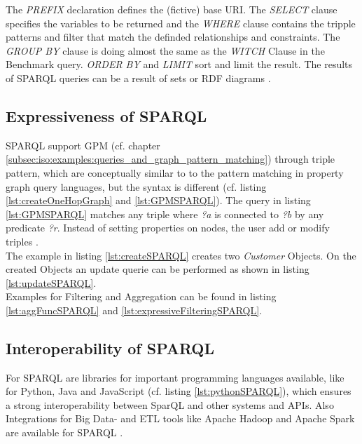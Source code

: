 The \textit{PREFIX} declaration defines the (fictive) base URI.
The \textit{SELECT} clause specifies the variables to be returned and the
\textit{WHERE} clause contains the tripple patterns and filter that match 
the definded relationships and constraints.
The \textit{GROUP BY} clause is doing almost the same as the \textit{WITCH} Clause in 
the Benchmark query.
\textit{ORDER BY} and \textit{LIMIT} sort and limit the result.
 The results of SPARQL queries can be a result 
of sets or RDF diagrams \citep{sparql_2024}.

\subsection{Expressiveness of SPARQL}
\label{subsec:different_query_languages_for_graph_databases:sparql:expressiveness}
SPARQL support GPM (cf. chapter \ref{subsec:iso:examples:queries_and_graph_pattern_matching})  through triple pattern, which are conceptually similar to 
to the pattern matching in property graph query languages, but the syntax is 
different (cf. listing \ref{lst:createOneHopGraph} and \ref{lst:GPMSPARQL}).
The query in listing \ref{lst:GPMSPARQL} matches any triple where \textit{?a} is connected to \textit{?b}
by any predicate \textit{?r}.
Instead of setting properties on nodes, the user add or modify triples \citep{sparql_2024}.\\ 
The example in listing \ref{lst:createSPARQL} creates two \textit{Customer} Objects.
On the created Objects an update querie can be performed 
as shown in listing \ref{lst:updateSPARQL}.\\
Examples for Filtering and Aggregation can be found in listing \ref{lst:aggFuncSPARQL} and  
\ref{lst:expressiveFilteringSPARQL}.


\subsection{Interoperability of SPARQL}
\label{subsec:different_query_languages_for_graph_databases:sparql:interoperability}
For SPARQL are libraries for important programming languages available, like for 
Python, Java and JavaScript (cf. listing \ref{lst:pythonSPARQL}),
which ensures a strong interoperability between SparQL and other systems and APIs. 
Also Integrations for Big Data- and \ac{ETL} tools 
like Apache Hadoop \citep{apache_hadoop_2024} and Apache Spark \citep{apache_spark_2024}
are available for SPARQL \citep{DBLP:journals/corr/NaackeCA16}.

